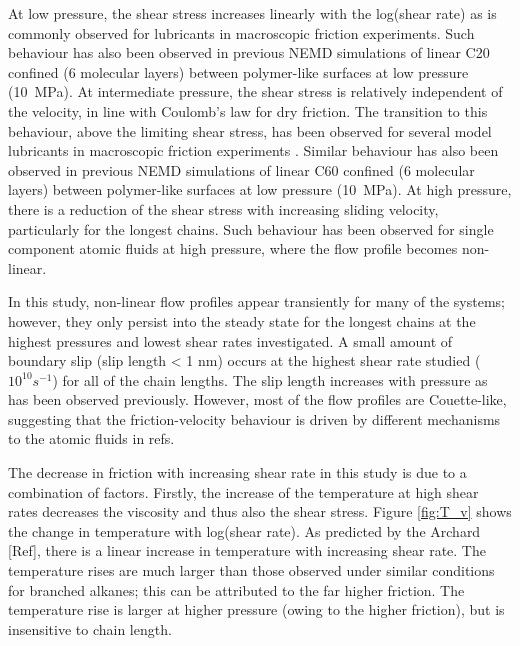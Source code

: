 \documentclass[aps,prb,reprint,superscriptaddress, a4paper]{revtex4-1}
\begin{document}
At low pressure, the shear stress increases linearly with the log(shear rate) as is commonly observed for lubricants in macroscopic friction experiments\cite{Ewen2017a}. Such behaviour has also been observed in previous NEMD simulations of linear C20 confined (6 molecular layers) between polymer-like surfaces at low pressure (\SI{10}{\mega\pascal})\cite{Sivebaek2010}. At intermediate pressure, the shear stress is relatively independent of the velocity, in line with Coulomb's law for dry friction. The transition to this behaviour, above the limiting shear stress, has been observed for several model lubricants in macroscopic friction experiments \cite{Martinie2016a}. Similar behaviour has also been observed in previous NEMD simulations of linear C60 confined (6 molecular layers) between polymer-like surfaces at low pressure (\SI{10}{\mega\pascal})\cite{Sivebaek2010}. At high pressure, there is a reduction of the shear stress with increasing sliding velocity, particularly for the longest chains. Such behaviour has been observed for single component atomic fluids at high pressure, where the flow profile becomes non-linear\cite{Heyes2012,Gattinoni2013,Mackowiak2016}.

In this study, non-linear flow profiles appear transiently for many of the systems; however, they only persist into the steady state for the longest chains at the highest pressures and lowest shear rates investigated. A small amount of boundary slip (slip length < 1 nm) occurs at the highest shear rate studied ($10^10 s^{-1}$) for all of the chain lengths. The slip length increases with pressure as has been observed previously\cite{Ta2017}. However, most of the flow profiles are Couette-like, suggesting that the friction-velocity behaviour is driven by different mechanisms to the atomic fluids in refs\cite{Heyes2012,Gattinoni2013,Mackowiak2016}.

The decrease in friction with increasing shear rate in this study is due to a combination of factors. Firstly, the increase of the temperature at high shear rates decreases the viscosity and thus also the shear stress. Figure \ref{fig:T_v} shows the change in temperature with log(shear rate). As predicted by the Archard [Ref], there is a linear increase in temperature with increasing shear rate. The temperature rises are much larger than those observed under similar conditions for branched alkanes\cite{Ewen2017a}; this can be attributed to the far higher friction. The temperature rise is larger at higher pressure \cite{Archard1959} (owing to the higher friction), but is insensitive to chain length.
\end{document}
